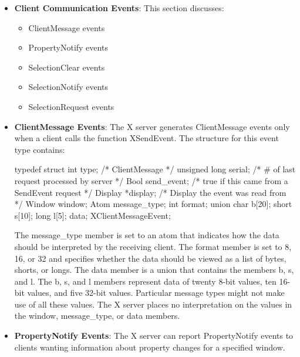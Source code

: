 \documentclass{report}
\begin{document}
\begin{itemize}
        \item \textbf{Client Communication Events}: This section discusses:
            \begin{itemize}
                \item ClientMessage events
                \item PropertyNotify events
                \item SelectionClear events
                \item SelectionNotify events
                \item SelectionRequest events
            \end{itemize}
        \item \textbf{ClientMessage Events}: The X server generates ClientMessage events only when a client calls the function XSendEvent.
            \bigbreak \noindent 
            The structure for this event type contains:
            \bigbreak \noindent 
            \begin{cppcode}
                typedef struct {
                    int type;                   /* ClientMessage */
                    unsigned long serial;       /* # of last request processed by server */
                    Bool send_event;            /* true if this came from a SendEvent request */
                    Display *display;           /* Display the event was read from */
                    Window window;
                    Atom message_type;
                    int format;
                    union {
                        char b[20];
                        short s[10];
                        long l[5];
                    } data;
                } XClientMessageEvent;
            \end{cppcode}
            \bigbreak \noindent 
            The message\_type member is set to an atom that indicates how the data should be interpreted by the receiving client. The format member is set to 8, 16, or 32 and specifies whether the data should be viewed as a list of bytes, shorts, or longs. The data member is a union that contains the members b, s, and l. The b, s, and l members represent data of twenty 8-bit values, ten 16-bit values, and five 32-bit values. Particular message types might not make use of all these values. The X server places no interpretation on the values in the window, message\_type, or data members.
        \item \textbf{PropertyNotify Events}: The X server can report PropertyNotify events to clients wanting information about property changes for a specified window.

\end{itemize}
\end{document}
